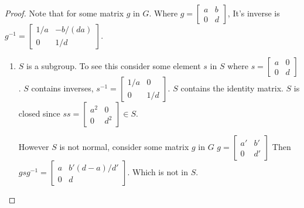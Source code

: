 \documentclass[12pt]{article}
\begin{document}
\begin{proof}

    Note that for some matrix $g$ in $G$. Where $
    g = \left[
        \begin{array}{cc}
            a & b \\
            0 & d
        \end{array}
    \right]$, It's inverse is $g^{-1} = 
    \left[
        \begin{array}{cc}
            1/a & -b/(da) \\
            0 & 1/d
        \end{array}
    \right]$.

    \begin{enumerate}

        \item $S$ is a subgroup. To see this consider some element $s$
            in $S$ where 
            $ s= 
                \left[
                    \begin{array}{cc}
                        a & 0 \\
                        0 & d
                    \end{array}
                \right]$. 
            $S$ contains inverses, $s^{-1} =
                \left[
                    \begin{array}{cc}
                        1/a & 0 \\
                        0   & 1/d
                    \end{array}
                \right]$. 
            $S$ contains the identity matrix. $S$ is closed since
            $ ss = 
                \left[
                    \begin{array}{cc}
                        a^2 & 0 \\
                        0 & d^2
                    \end{array}
                \right] \in S$.

            However $S$ is not normal, consider some matrix $g$ in $G$ 
            $g = \left[
            \begin{array}{cc}
                a' & b' \\
                0 & d'
            \end{array}
            \right]$
            Then $gsg^{-1} = \left[
            \begin{array}{cc}
                a & b'(d - a)/d' \\
                0 & d
            \end{array}
            \right]$. Which is not in $S$.


\end{enumerate}
\end{proof}
\end{document}
